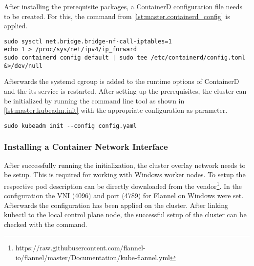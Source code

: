 
%


After installing the prerequisite packages, a ContainerD configuration file needs to be created. For this, the command from \autoref{lst:master.containerd_config} is applied.
\begin{lstlisting}[label=lst:master.containerd_config, caption={Bash command for setting up containerd config}]
sudo sysctl net.bridge.bridge-nf-call-iptables=1
echo 1 > /proc/sys/net/ipv4/ip_forward
sudo containerd config default | sudo tee /etc/containerd/config.toml &>/dev/null
\end{lstlisting}
Afterwards the systemd \ac{cgroup} is added to the runtime options of ContainerD and the its service is restarted.
After setting up the prerequisites, the cluster can be initialized by running the command line tool as shown in \autoref{lst:master.kubeadm.init} with the appropriate configuration as parameter.
\begin{lstlisting}[label=lst:master.kubeadm.init, caption={Bash command for setting up the cluster}]
sudo kubeadm init --config config.yaml
\end{lstlisting}

\subsubsection{Installing a Container Network Interface}
After successfully running the initialization, the cluster overlay network  needs to be setup.
This is required for working with \ac{Windows} worker nodes.  To setup  the respective pod description can be directly downloaded from the vendor\footnote{https://raw.githubusercontent.com/flannel-io/flannel/master/Documentation/kube-flannel.yml}. In the configuration the \ac{VNI} (4096) and port (4789) for Flannel on \ac{Windows} were set. Afterwards the configuration has been applied on the cluster.
After linking kubectl to the local control plane node, the successful setup of the cluster can be checked with the  command.


